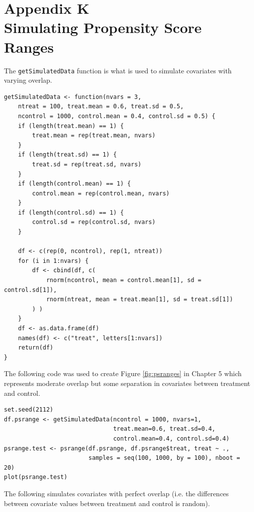 \clearpage
{}
\section*{Appendix K\\Simulating Propensity Score Ranges}

\begin{singlespace}

\noindent The \texttt{getSimulatedData} function is what is used to simulate covariates with varying overlap.

\begin{verbatim}
getSimulatedData <- function(nvars = 3, 
    ntreat = 100, treat.mean = 0.6, treat.sd = 0.5, 
    ncontrol = 1000, control.mean = 0.4, control.sd = 0.5) {
    if (length(treat.mean) == 1) {
        treat.mean = rep(treat.mean, nvars)
    }
    if (length(treat.sd) == 1) {
        treat.sd = rep(treat.sd, nvars)
    }
    if (length(control.mean) == 1) {
        control.mean = rep(control.mean, nvars)
    }
    if (length(control.sd) == 1) {
        control.sd = rep(control.sd, nvars)
    }
    
    df <- c(rep(0, ncontrol), rep(1, ntreat))
    for (i in 1:nvars) {
        df <- cbind(df, c(
            rnorm(ncontrol, mean = control.mean[1], sd = control.sd[1]), 
            rnorm(ntreat, mean = treat.mean[1], sd = treat.sd[1])
        ) )
    }
    df <- as.data.frame(df)
    names(df) <- c("treat", letters[1:nvars])
    return(df)
}
\end{verbatim}

\noindent The following code was used to create Figure \ref{fig:psranges} in Chapter 5 which represents moderate overlap but some separation in covariates between treatment and control.


\begin{verbatim}
set.seed(2112)
df.psrange <- getSimulatedData(ncontrol = 1000, nvars=1,
                               treat.mean=0.6, treat.sd=0.4,
                               control.mean=0.4, control.sd=0.4)
psrange.test <- psrange(df.psrange, df.psrange$treat, treat ~ ., 
                        samples = seq(100, 1000, by = 100), nboot = 20)
plot(psrange.test)
\end{verbatim}

\noindent The following simulates covariates with perfect overlap (i.e. the differences between covariate values between treatment and control is random).


\end{singlespace}
